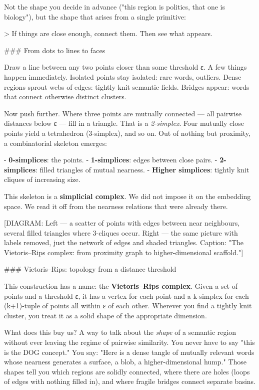 \documentclass[12pt,a4paper]{article}
\begin{document}
Not the shape you decide in advance ("this region is politics, that one is biology"), but the shape that arises from a single primitive:

> If things are close enough, connect them. Then see what appears.

\#\#\# From dots to lines to faces

Draw a line between any two points closer than some threshold ε. A few things happen immediately. Isolated points stay isolated: rare words, outliers. Dense regions sprout webs of edges: tightly knit semantic fields. Bridges appear: words that connect otherwise distinct clusters.

Now push further. Where three points are mutually connected --- all pairwise distances below ε --- fill in a triangle. That is a \textit{2-simplex}. Four mutually close points yield a tetrahedron (3-simplex), and so on. Out of nothing but proximity, a combinatorial skeleton emerges:

- \textbf{0-simplices}: the points.
- \textbf{1-simplices}: edges between close pairs.
- \textbf{2-simplices}: filled triangles of mutual nearness.
- \textbf{Higher simplices}: tightly knit cliques of increasing size.

This skeleton is a \textbf{simplicial complex}. We did not impose it on the embedding space. We read it off from the nearness relations that were already there.

[DIAGRAM: Left --- a scatter of points with edges between near neighbours, several filled triangles where 3-cliques occur. Right --- the same picture with labels removed, just the network of edges and shaded triangles. Caption: "The Vietoris–Rips complex: from proximity graph to higher-dimensional scaffold."]

\#\#\# Vietoris–Rips: topology from a distance threshold

This construction has a name: the \textbf{Vietoris–Rips complex}. Given a set of points and a threshold ε, it has a vertex for each point and a k-simplex for each (k+1)-tuple of points all within ε of each other. Wherever you find a tightly knit cluster, you treat it as a solid shape of the appropriate dimension.

What does this buy us? A way to talk about the \textit{shape} of a semantic region without ever leaving the regime of pairwise similarity. You never have to say "this is the DOG concept." You say: "Here is a dense tangle of mutually relevant words whose nearness generates a surface, a blob, a higher-dimensional hump." Those shapes tell you which regions are solidly connected, where there are holes (loops of edges with nothing filled in), and where fragile bridges connect separate basins.
\end{document}

